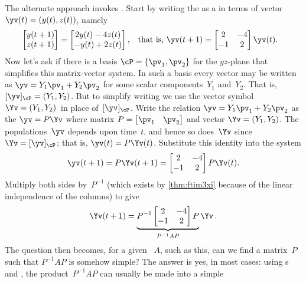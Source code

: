 The alternate approach invokes .
Start by writing the  as a  in terms of vector \(\yv(t)=(y(t),z(t))\), namely
\begin{align*}&
\begin{bmatrix} y(t+1)\\z(t+1) \end{bmatrix}
=\begin{bmatrix} 2y(t)-4z(t)\\-y(t)+2z(t) \end{bmatrix}
,&& \text{that is, }
\yv(t+1)=\begin{bmatrix} 2&-4\\-1&2 \end{bmatrix}\yv(t).
\end{align*}
Now let's ask if there is a basis \(\cP=\{\pv_1,\pv_2\}\) for the \(yz\)-plane that simplifies this matrix-vector system.
In such a basis every vector may be written as \(\yv=Y_1\pv_1+Y_2\pv_2\) for some scalar components~\(Y_1\) and~\(Y_2\).
That is,  \([\yv]_\cP=(Y_1,Y_2)\).
But to simplify writing we use the vector symbol~\(\Yv=(Y_1,Y_2)\)\ in place of~\([\yv]_\cP\).
Write the relation \(\yv=Y_1\pv_1+Y_2\pv_2\) as the  \(\yv=P\Yv\) where matrix \(P=\begin{bmatrix} \pv_1&\pv_2 \end{bmatrix}\) and vector \(\Yv=(Y_1,Y_2)\).
The populations~\(\yv\) depends upon time~\(t\), and hence so does~\(\Yv\) since \(\Yv=[\yv]_\cP\); that is, \(\yv(t)=P\Yv(t)\).
Substitute this identity into the system 
\begin{equation*}
\yv(t+1)=P\Yv(t+1)=\begin{bmatrix} 2&-4\\-1&2 \end{bmatrix}P\Yv(t).
\end{equation*}
Multiply both sides by~\(P^{-1}\) (which exists by \cref{thm:ftim3xi} because of the linear independence of the columns) to give
\begin{equation*}
\Yv(t+1)=\underbrace{P^{-1}\begin{bmatrix} 2&-4\\-1&2 \end{bmatrix}P}_{P^{-1}AP}\Yv\,.
\end{equation*}
The question then becomes, for a given ~\(A\), such as this, can we find a matrix~\(P\) such that \(P^{-1}AP\) is somehow simple?
The answer is yes, in most cases: using s and , the product~\(P^{-1}AP\) can usually be made into a simple 



